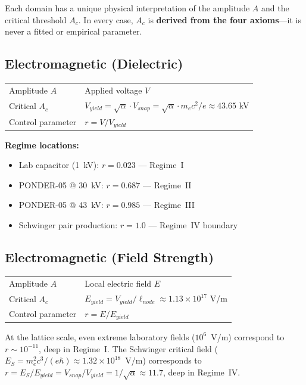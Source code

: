 Each domain has a unique physical interpretation of the amplitude $A$ and the critical threshold $A_c$. In every case, $A_c$ is \textbf{derived from the four axioms}---it is never a fitted or empirical parameter.

\subsection{Electromagnetic (Dielectric)}

\begin{center}
\begin{tabular}{ll}
\toprule
Amplitude $A$ & Applied voltage $V$ \\
Critical $A_c$ & $V_{yield} = \sqrt{\alpha} \cdot V_{snap} = \sqrt{\alpha} \cdot m_e c^2/e \approx 43.65$ kV \\
Control parameter & $r = V / V_{yield}$ \\
\bottomrule
\end{tabular}
\end{center}

\noindent \textbf{Regime locations:}
\begin{itemize}
    \item Lab capacitor (1~kV): $r = 0.023$ --- Regime~I
    \item PONDER-05 @ 30~kV: $r = 0.687$ --- Regime~II
    \item PONDER-05 @ 43~kV: $r = 0.985$ --- Regime~III
    \item Schwinger pair production: $r = 1.0$ --- Regime~IV boundary
\end{itemize}

\subsection{Electromagnetic (Field Strength)}

\begin{center}
\begin{tabular}{ll}
\toprule
Amplitude $A$ & Local electric field $E$ \\
Critical $A_c$ & $E_{yield} = V_{yield}/\ell_{node} \approx 1.13 \times 10^{17}$ V/m \\
Control parameter & $r = E / E_{yield}$ \\
\bottomrule
\end{tabular}
\end{center}

\noindent At the lattice scale, even extreme laboratory fields ($10^6$~V/m) correspond to $r \sim 10^{-11}$, deep in Regime~I. The Schwinger critical field ($E_S = m_e^2 c^3/(e\hbar) \approx 1.32 \times 10^{18}$~V/m) corresponds to $r = E_S/E_{yield} = V_{snap}/V_{yield} = 1/\sqrt{\alpha} \approx 11.7$, deep in Regime~IV.

